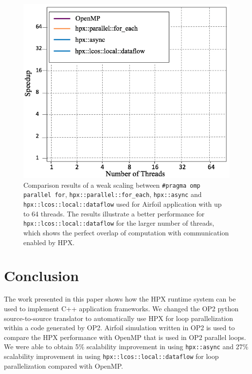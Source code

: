 \documentclass[conference]{IEEEtran}
\begin{document}
\begin{figure} 
\begin{center}
\centering
\includegraphics[width=1\columnwidth]{Pictures/weak.jpg}
\caption {\small{Comparison results of a weak scaling between \texttt{\#pragma omp parallel for}, \texttt{hpx::parallel::for\_each}, \texttt{hpx::async} and \texttt{hpx::lcos::local::dataflow} used for Airfoil application
with up to 64 threads. The results illustrate a better performance for \texttt{hpx::lcos::local::dataflow} for the larger number of threads, which shows
the perfect overlap of computation with communication enabled by HPX.}}
\label{f2}
\end{center}
\end{figure}






\section{Conclusion}
\label{sec:future}

The work presented in this paper shows how the HPX runtime system can be used to implement C++ application frameworks. We changed the OP2 python source-to-source translator to automatically use HPX for loop parallelization within a code generated by OP2. Airfoil simulation written in OP2 is used to compare the HPX performance with OpenMP that is used in OP2 parallel loops. We were able to obtain 5\% scalability improvement in using \texttt{hpx::async} and 27\% scalability improvement in using \texttt{hpx::lcos::local::dataflow} for loop parallelization compared with OpenMP.
\end{document}
